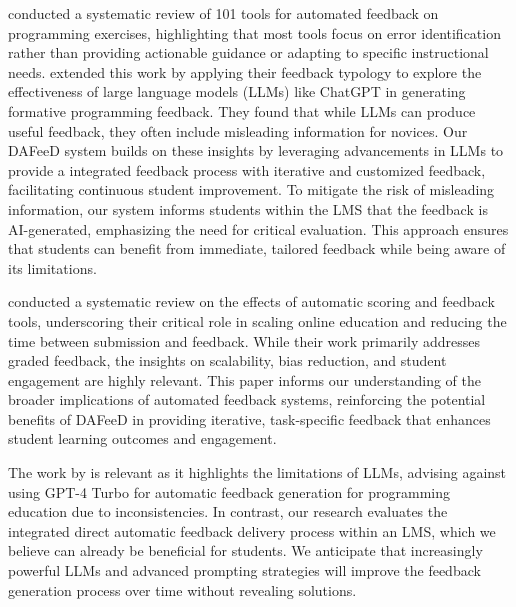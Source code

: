 \documentclass[manuscript,screen,review]{acmart}
\begin{document}
\citet{keuning:2018:SystematicLiteratureReview} conducted a systematic review of 101 tools for automated feedback on programming exercises, highlighting that most tools focus on error identification rather than providing actionable guidance or adapting to specific instructional needs. \cite{kiesler:2023:ExploringPotentialLarge} extended this work by applying their feedback typology to explore the effectiveness of large language models (LLMs) like ChatGPT in generating formative programming feedback. They found that while LLMs can produce useful feedback, they often include misleading information for novices. Our DAFeeD system builds on these insights by leveraging advancements in LLMs to provide a integrated feedback process with iterative and customized feedback, facilitating continuous student improvement. To mitigate the risk of misleading information, our system informs students within the LMS that the feedback is AI-generated, emphasizing the need for critical evaluation. This approach ensures that students can benefit from immediate, tailored feedback while being aware of its limitations.

\citet{hahn:2021:SystematicReviewEffects} conducted a systematic review on the effects of automatic scoring and feedback tools, underscoring their critical role in scaling online education and reducing the time between submission and feedback. While their work primarily addresses graded feedback, the insights on scalability, bias reduction, and student engagement are highly relevant. This paper informs our understanding of the broader implications of automated feedback systems, reinforcing the potential benefits of DAFeeD in providing iterative, task-specific feedback that enhances student learning outcomes and engagement.

The work by \citet{azaiz:2024:FeedbackGenerationProgrammingExercises} is relevant as it highlights the limitations of LLMs, advising against using GPT-4 Turbo for automatic feedback generation for programming education due to inconsistencies. In contrast, our research evaluates the integrated direct automatic feedback delivery process within an LMS, which we believe can already be beneficial for students. We anticipate that increasingly powerful LLMs and advanced prompting strategies will improve the feedback generation process over time without revealing solutions.
\end{document}
